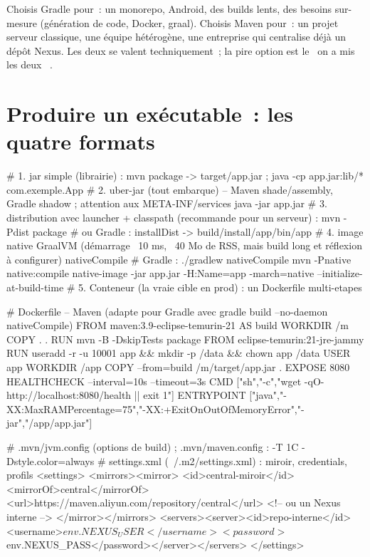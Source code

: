 \begin{note}
Choisis Gradle pour~: un monorepo, Android, des builds lents, des besoins sur-mesure (g\'en\'eration de
code, Docker, graal). Choisis Maven pour~: un projet serveur classique, une \'equipe h\'et\'erog\`ene, une
entreprise qui centralise d\'ej\`a un d\'ep\^ot Nexus. Les deux se valent techniquement~; la pire option est
le \og ~on a mis les deux~ \fg{}.
\end{note}

\section{Produire un ex\'ecutable~: les quatre formats}

\begin{terminal}
# 1. jar simple (librairie) : mvn package -> target/app.jar ; java -cp app.jar:lib/* com.exemple.App
# 2. uber-jar (tout embarque) -- Maven shade/assembly, Gradle shadow ; attention aux META-INF/services
java -jar app.jar
# 3. distribution avec launcher + classpath (recommande pour un serveur) :
mvn -Pdist package         # ou Gradle : installDist -> build/install/app/bin/app
# 4. image native GraalVM (d\'emarrage ~10 ms, ~40 Mo de RSS, mais build long et r\'eflexion \`a configurer)
nativeCompile          # Gradle : ./gradlew nativeCompile
mvn -Pnative native:compile
native-image -jar app.jar -H:Name=app -march=native --initialize-at-build-time
# 5. Conteneur (la vraie cible en prod) : un Dockerfile multi-etapes
\end{terminal}

\begin{codeconf}
# Dockerfile -- Maven (adapte pour Gradle avec gradle build --no-daemon nativeCompile)
FROM maven:3.9-eclipse-temurin-21 AS build
WORKDIR /m
COPY . .
RUN mvn -B -DskipTests package
FROM eclipse-temurin:21-jre-jammy
RUN useradd -r -u 10001 app && mkdir -p /data && chown app /data
USER app
WORKDIR /app
COPY --from=build /m/target/app.jar .
EXPOSE 8080
HEALTHCHECK --interval=10s --timeout=3s CMD ["sh","-c","wget -qO- http://localhost:8080/health || exit 1"]
ENTRYPOINT ["java","-XX:MaxRAMPercentage=75","-XX:+ExitOnOutOfMemoryError","-jar","/app/app.jar"]
\end{codeconf}

\begin{codeconf}
# .mvn/jvm.config (options de build) ; .mvn/maven.config : -T 1C -Dstyle.color=always
# settings.xml (~/.m2/settings.xml) : miroir, credentials, profils
<settings>
  <mirrors><mirror>
    <id>central-miroir</id><mirrorOf>central</mirrorOf>
    <url>https://maven.aliyun.com/repository/central</url>   <!-- ou un Nexus interne -->
  </mirror></mirrors>
  <servers><server><id>repo-interne</id><username>${env.NEXUS_USER}</username>
           <password>${env.NEXUS_PASS}</password></server></servers>
</settings>
\end{codeconf}

